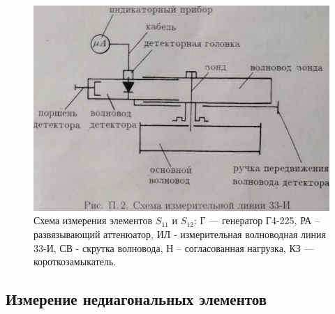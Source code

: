 ﻿\documentclass[a4paper,11pt]{article}
\begin{document}
\begin{figure}[h!]
	\centering
	\includegraphics[]{img/3.jpg}
	\caption{Схема измерения элементов $S_{11}$ и $S_{12}$:  Г --- генератор Г4-225, РА  -- развязывающий аттенюатор, ИЛ - измерительная волноводная линия 33-И, СВ - скрутка волновода,  Н -- согласованная нагрузка, КЗ --- короткозамыкатель.}
	\label{fig:fig3}
\end{figure}


\subsection{Измерение недиагональных элементов}
\end{document}
